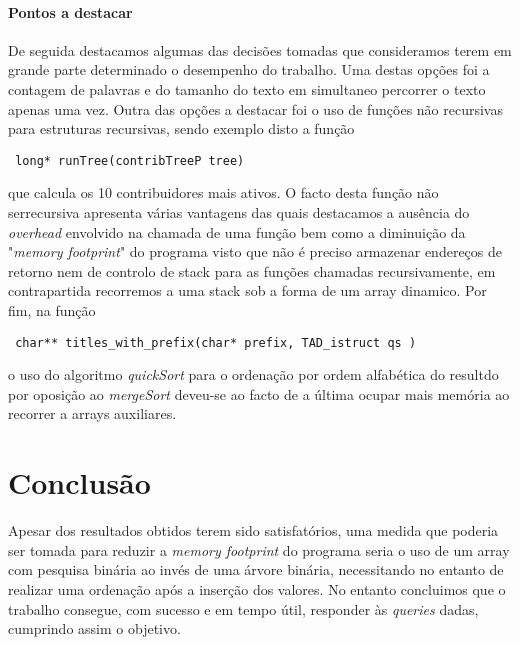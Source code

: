 \documentclass{report}
\begin{document}
\subsection{Pontos a destacar}
De seguida destacamos algumas das decisões tomadas que consideramos terem em grande parte determinado o desempenho do trabalho.
Uma destas opções foi a contagem de palavras e do tamanho do texto em simultaneo percorrer o texto apenas uma vez.
Outra das opções a destacar foi o uso de funções não recursivas para estruturas recursivas, sendo exemplo disto a função \begin{verbatim} long* runTree(contribTreeP tree) \end{verbatim} que calcula os 10 contribuidores mais ativos. O facto desta função não serrecursiva apresenta várias vantagens das quais destacamos a ausência do \textit{overhead} envolvido na chamada de uma função bem como a diminuição da "\textit{memory footprint}" do programa visto que não é preciso armazenar endereços de retorno nem de controlo de stack para as funções chamadas recursivamente, em contrapartida recorremos a uma stack sob a forma de um array dinamico.
Por fim, na função \begin{verbatim} char** titles_with_prefix(char* prefix, TAD_istruct qs ) \end{verbatim} o uso do algoritmo \textit{quickSort} para o ordenação por ordem alfabética do resultdo por oposição ao \textit{mergeSort} deveu-se ao facto de a última ocupar mais memória ao recorrer a arrays auxiliares.

\part{Conclusão}
Apesar dos resultados obtidos terem sido satisfatórios, uma medida que poderia ser tomada para reduzir a \textit{memory footprint} do programa seria o uso de um array com pesquisa binária ao invés de uma árvore binária, necessitando no entanto de realizar uma ordenação após a inserção dos valores.
No entanto concluimos que o trabalho consegue, com sucesso e em tempo útil, responder às \textit{queries} dadas, cumprindo assim o objetivo.
\end{document}
